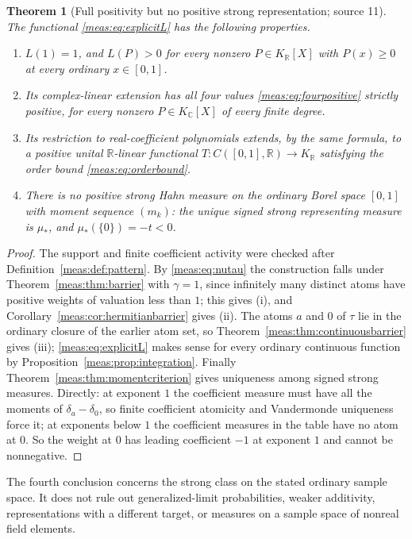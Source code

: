 \documentclass[11pt]{article}
\numberwithin{equation}{section}
\newtheorem{theorem}{Theorem}[section]
\theoremstyle{definition}
\theoremstyle{remark}
\newcommand{\R}{\mathbb R}
\newcommand{\C}{\mathbb C}
\newcommand{\KR}{K_{\R}}
\newcommand{\KC}{K_{\C}}
\begin{document}
\begin{theorem}[Full positivity but no positive strong representation;
source 11]\label{meas:thm:example}
The functional \eqref{meas:eq:explicitL} has the following properties.
\begin{enumerate}[label=(\roman*)]
\item $L(1)=1$, and $L(P)>0$ for every nonzero $P\in\KR[X]$ with $P(x)\ge0$ at
every ordinary $x\in[0,1]$.
\item Its complex-linear extension has all four values \eqref{meas:eq:fourpositive}
strictly positive, for every nonzero $P\in\KC[X]$ of every finite degree.
\item Its restriction to real-coefficient polynomials extends, by the same
formula, to a positive unital $\R$-linear functional
$T:C([0,1],\R)\to\KR$ satisfying the order bound \eqref{meas:eq:orderbound}.
\item There is no positive strong Hahn measure on the ordinary Borel space
$[0,1]$ with moment sequence $(m_k)$: the unique signed strong representing
measure is $\mu_*$, and $\mu_*(\{0\})=-t<0$.
\end{enumerate}
\end{theorem}
\begin{proof}
The support and finite coefficient activity were checked after
Definition~\ref{meas:def:pattern}. By \eqref{meas:eq:nutau} the construction falls
under Theorem~\ref{meas:thm:barrier} with $\gamma=1$, since infinitely many
distinct atoms have positive weights of valuation less than $1$; this gives (i),
and Corollary~\ref{meas:cor:hermitianbarrier} gives (ii). The atoms $a$ and $0$ of
$\tau$ lie in the ordinary closure of the earlier atom set, so
Theorem~\ref{meas:thm:continuousbarrier} gives (iii); \eqref{meas:eq:explicitL}
makes sense for every ordinary continuous function by
Proposition~\ref{meas:prop:integration}. Finally
Theorem~\ref{meas:thm:momentcriterion} gives uniqueness among signed strong
measures. Directly: at exponent $1$ the coefficient measure must have all the
moments of $\delta_a-\delta_0$, so finite coefficient atomicity and Vandermonde
uniqueness force it; at exponents below $1$ the coefficient measures in the table
have no atom at $0$. So the weight at $0$ has leading coefficient $-1$ at exponent
$1$ and cannot be nonnegative.
\end{proof}

The fourth conclusion concerns the strong class on the stated ordinary sample
space. It does not rule out generalized-limit probabilities, weaker
additivity, representations with a different target, or measures on a sample
space of nonreal field elements.
\end{document}
